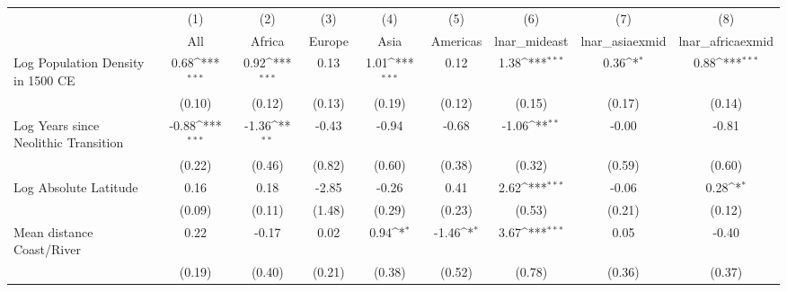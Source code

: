 {
\def\sym#1{\ifmmode^{#1}\else\(^{#1}\)\fi}
\begin{tabular}{l*{8}{c}}
\toprule
                    &\multicolumn{1}{c}{(1)}         &\multicolumn{1}{c}{(2)}         &\multicolumn{1}{c}{(3)}         &\multicolumn{1}{c}{(4)}         &\multicolumn{1}{c}{(5)}         &\multicolumn{1}{c}{(6)}         &\multicolumn{1}{c}{(7)}         &\multicolumn{1}{c}{(8)}         \\
                    &         All         &      Africa         &      Europe         &        Asia         &    Americas         &lnar\_mideast         &lnar\_asiaexmid         &lnar\_africaexmid         \\
\midrule
Log Population Density in 1500 CE&        0.68\sym{***}&        0.92\sym{***}&        0.13         &        1.01\sym{***}&        0.12         &        1.38\sym{***}&        0.36\sym{*}  &        0.88\sym{***}\\
                    &      (0.10)         &      (0.12)         &      (0.13)         &      (0.19)         &      (0.12)         &      (0.15)         &      (0.17)         &      (0.14)         \\
\addlinespace
Log Years since Neolithic Transition&       -0.88\sym{***}&       -1.36\sym{**} &       -0.43         &       -0.94         &       -0.68         &       -1.06\sym{**} &       -0.00         &       -0.81         \\
                    &      (0.22)         &      (0.46)         &      (0.82)         &      (0.60)         &      (0.38)         &      (0.32)         &      (0.59)         &      (0.60)         \\
\addlinespace
Log Absolute Latitude&        0.16         &        0.18         &       -2.85         &       -0.26         &        0.41         &        2.62\sym{***}&       -0.06         &        0.28\sym{*}  \\
                    &      (0.09)         &      (0.11)         &      (1.48)         &      (0.29)         &      (0.23)         &      (0.53)         &      (0.21)         &      (0.12)         \\
\addlinespace
Mean distance Coast/River&        0.22         &       -0.17         &        0.02         &        0.94\sym{*}  &       -1.46\sym{*}  &        3.67\sym{***}&        0.05         &       -0.40         \\
                    &      (0.19)         &      (0.40)         &      (0.21)         &      (0.38)         &      (0.52)         &      (0.78)         &      (0.36)         &      (0.37)         \\

\end{tabular}}
